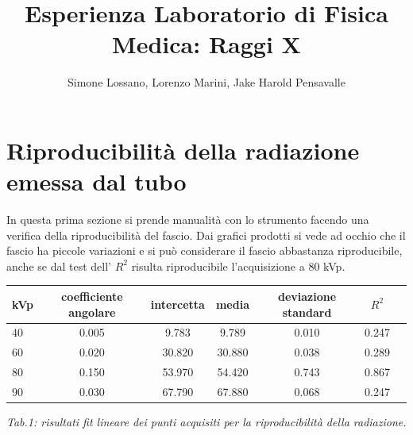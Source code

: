 \documentclass[a4paper]{article}
\title{Esperienza Laboratorio di Fisica Medica: Raggi X}
\author{Simone Lossano, Lorenzo Marini, Jake Harold Pensavalle}
\begin{document}
	\maketitle
	\newpage
	\tableofcontents
	\newpage

\section{Riproducibilità della radiazione emessa dal tubo}


In questa prima sezione si prende manualità con lo strumento facendo una verifica della riproducibilità del fascio. Dai grafici prodotti si vede ad occhio che il fascio ha piccole variazioni e si può considerare il fascio abbastanza riproducibile, anche se dal test dell' $R^{2}$ risulta riproducibile l'acquisizione a 80 kVp.
\begin{center} 
		
		\begin{tabular}{lcccccc}
			\hline
			\hline
			\textbf{kVp}	& \textbf{coefficiente angolare}& \textbf{intercetta}& \textbf{media}& \textbf{deviazione standard}& \textbf{$R^{2}$} 	 \\
			\hline
			\hline
			40	&0.005&9.783&9.789&0.010&0.247 	\\
			60	&0.020&30.820&30.880&0.038&0.289\\
			80	&0.150&53.970&54.420&0.743&0.867 \\
			90	&0.030&67.790&67.880&0.068&0.247\\
			
			\hline
			\hline
		\end{tabular}
		\linebreak
		\emph{Tab.1: risultati fit lineare dei punti acquisiti per la riproducibilità della radiazione.} 
	\end{center}
\end{document}
